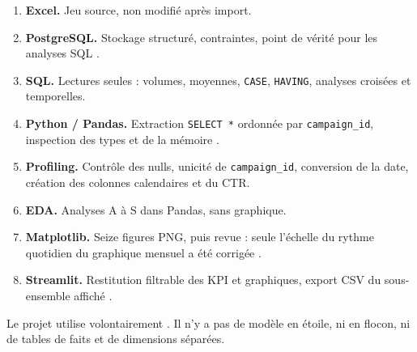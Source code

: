 \begin{enumerate}
\item \textbf{Excel.} Jeu source, non modifié après import.
\item \textbf{PostgreSQL.} Stockage structuré, contraintes, point de vérité pour les analyses SQL \cite{postgresql18}.
\item \textbf{SQL.} Lectures seules : volumes, moyennes, \texttt{CASE}, \texttt{HAVING}, analyses croisées et temporelles.
\item \textbf{Python / Pandas.} Extraction \texttt{SELECT *} ordonnée par \texttt{campaign\_id}, inspection des types et de la mémoire \cite{pandasdocs,sqlalchemydocs}.
\item \textbf{Profiling.} Contrôle des nulls, unicité de \texttt{campaign\_id}, conversion de la date, création des colonnes calendaires et du CTR.
\item \textbf{EDA.} Analyses A à S dans Pandas, sans graphique.
\item \textbf{Matplotlib.} Seize figures PNG, puis revue : seule l'échelle du rythme quotidien du graphique mensuel a été corrigée \cite{matplotlibdocs}.
\item \textbf{Streamlit.} Restitution filtrable des KPI et graphiques, export CSV du sous-ensemble affiché \cite{streamlitdocs}.
\end{enumerate}

\begin{infobox}
Le projet utilise volontairement . Il n'y a pas de modèle en étoile, ni en flocon, ni de tables de faits et de dimensions séparées.
\end{infobox}
